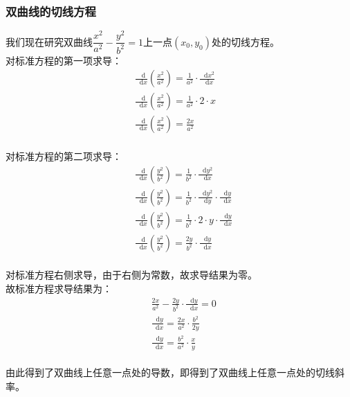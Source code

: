 \documentclass[UTF8]{ctexart}
\newcommand*{\dif}{\mathop{}\!\mathrm{d}}
\begin{document}
\subsubsection{双曲线的切线方程}
    我们现在研究双曲线$\dfrac{x^2}{a^2}-\dfrac{y^2}{b^2}=1$上一点$(x_0,y_0)$处的切线方程。\\[5mm]
    对标准方程的第一项求导：
    \setcounter{equation}{0}
    \begin{align}
        &\frac{\dif}{\dif x}\left(\frac{x^2}{a^2}\right)=\frac{1}{a^2}\cdot\frac{\dif x^2}{\dif x}~~~~~~~~\\[4mm]
        &\frac{\dif}{\dif x}\left(\frac{x^2}{a^2}\right)=\frac{1}{a^2}\cdot 2\cdot x\\[4mm]
        &\frac{\dif}{\dif x}\left(\frac{x^2}{a^2}\right)=\frac{2x}{a^2}
    \end{align}\\
    对标准方程的第二项求导：
    \setcounter{equation}{0}
    \begin{align}
        &\frac{\dif}{\dif x}\left(\frac{y^2}{b^2}\right)=\frac{1}{b^2}\cdot\frac{\dif y^2}{\dif x}\\[4mm]
        &\frac{\dif}{\dif x}\left(\frac{y^2}{b^2}\right)=\frac{1}{b^2}\cdot\frac{\dif y^2}{\dif y}\cdot\frac{\dif y}{\dif x}\\[4mm]
        &\frac{\dif}{\dif x}\left(\frac{y^2}{b^2}\right)=\frac{1}{b^2}\cdot 2\cdot y\cdot \frac{\dif y}{\dif x}\\[4mm]
        &\frac{\dif}{\dif x}\left(\frac{y^2}{b^2}\right)=\frac{2y}{b^2}\cdot\frac{\dif y}{\dif x}
    \end{align}\\
    对标准方程右侧求导，由于右侧为常数，故求导结果为零。\\[12mm]
    故标准方程求导结果为：
    \begin{align}
        &\frac{2x}{a^2}-\frac{2y}{b^2}\cdot\frac{\dif y}{\dif x}=0\\[5mm]
        &\frac{\dif y}{\dif x}=\frac{2x}{a^2}\cdot\frac{b^2}{2y}\\[5mm]
        &\frac{\dif y}{\dif x}=\frac{b^2}{a^2}\cdot\frac{x}{y}
    \end{align}\\
    由此得到了双曲线上任意一点处的导数，即得到了双曲线上任意一点处的切线斜率。

\newpage
\end{document}

